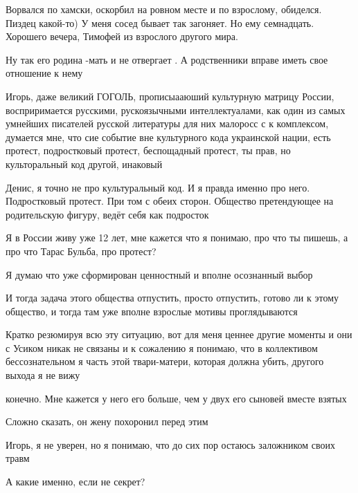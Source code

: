 \begin{itemize}
\begin{itemize}
Ворвался по хамски, оскорбил на ровном месте и по взрослому, обиделся. Пиздец какой-то)
У меня сосед бывает так загоняет.
Но ему семнадцать.
Хорошего вечера, Тимофей из взрослого другого мира.

\end{itemize} %

Ну так его родина -мать и не отвергает . А родственники вправе иметь свое отношение к нему


Игорь, даже великий ГОГОЛЬ, прописыааюший культурную матрицу России,
восприримается русскими, рускоязычными интеллектуалами, как один из самых
умнейших писателей русской литературы для них малоросс с к комплексом, думается
мне, что сие событие вне культурного кода украинской нации, есть протест,
подростковый протест, беспощадный протест, ты прав, но культоральный код
другой, инаковый

\begin{itemize} %
Денис, я точно не про культуральный код.
И я правда именно про него. Подростковый протест. При том с обеих сторон.
Общество претендующее на родительскую фигуру, ведёт себя как подросток

Я в России живу уже 12 лет, мне кажется что я понимаю, про что ты пишешь, а про что Тарас Бульба, про протест?

Я думаю что уже сформирован ценностный и вполне осознанный выбор

И тогда задача этого общества отпустить, просто отпустить, готово ли к этому общество, и тогда там уже вполне взрослые мотивы проглядываются


Кратко резюмируя всю эту ситуацию, вот для меня ценнее другие моменты и они с
Усиком никак не связаны и к сожалению я понимаю, что в коллективом
бессознательном я часть этой твари-матери, которая должна убить, другого выхода
я не вижу

конечно. Мне кажется у него его больше, чем у двух его сыновей вместе взятых

Сложно сказать, он жену похоронил перед этим

Игорь, я не уверен, но я понимаю, что до сих пор остаюсь заложником своих травм


А какие именно, если не секрет?


\end{itemize}
\end{itemize}
